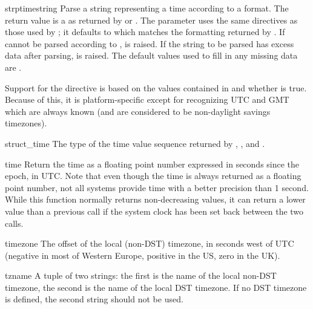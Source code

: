 \begin{funcdesc}{strptime}{string}
Parse a string representing a time according to a format.  The return 
value is a  as returned by  or
.  The  parameter uses the same
directives as those used by ; it defaults to
 which matches the formatting
returned by .  If  cannot be parsed
according to ,  is raised.  If the
string to be parsed has excess data after parsing,
 is raised.  The default values used to fill in
any missing data are  .

Support for the  directive is based on the values contained in
 and whether  is true.  Because of this,
it is platform-specific except for recognizing UTC and GMT which are
always known (and are considered to be non-daylight savings
timezones).
\end{funcdesc}

\begin{datadesc}{struct_time}
The type of the time value sequence returned by ,
, and .
\end{datadesc}

\begin{funcdesc}{time}{}
Return the time as a floating point number expressed in seconds since
the epoch, in UTC.  Note that even though the time is always returned
as a floating point number, not all systems provide time with a better
precision than 1 second.  While this function normally returns
non-decreasing values, it can return a lower value than a previous
call if the system clock has been set back between the two calls.
\end{funcdesc}

\begin{datadesc}{timezone}
The offset of the local (non-DST) timezone, in seconds west of UTC
(negative in most of Western Europe, positive in the US, zero in the
UK).
\end{datadesc}

\begin{datadesc}{tzname}
A tuple of two strings: the first is the name of the local non-DST
timezone, the second is the name of the local DST timezone.  If no DST
timezone is defined, the second string should not be used.
\end{datadesc}

